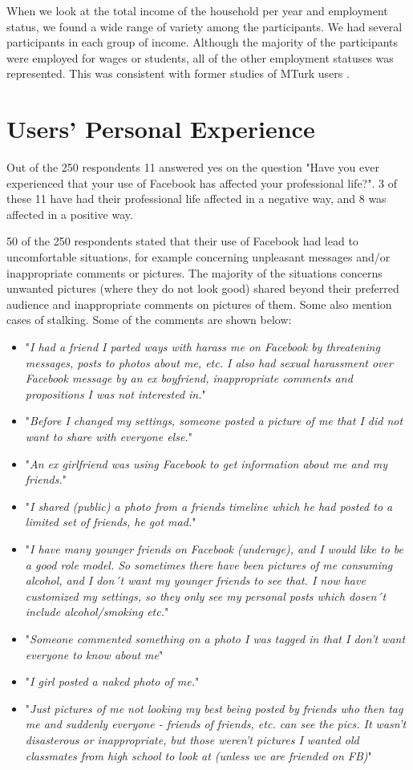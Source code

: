 When we look at the total income of the household per year and employment status, we found a wide range of variety among the participants. We had several participants in each group of income. Although the majority of the participants were employed for wages or students, all of the other employment statuses was represented. This was consistent with former studies of MTurk users \cite{incentivesAmt}. 



\section{Users' Personal Experience}
Out of the 250 respondents 11 answered yes on the question "Have you ever experienced that your use of Facebook has affected your professional life?". 3 of these 11 have had their professional life affected in a negative way, and 8 was affected in a positive way. 

50 of the 250 respondents stated that their use of Facebook had lead to uncomfortable situations, for example concerning unpleasant messages and/or inappropriate comments or pictures. The majority of the situations concerns unwanted pictures (where they do not look good) shared beyond their preferred audience and inappropriate comments on pictures of them. Some also mention cases of stalking. Some of the comments are shown below:

\begin{itemize} 
\item "\textit{I had a friend I parted ways with harass me on Facebook by threatening messages, posts to photos about me, etc. I also had sexual harassment over Facebook message by an ex boyfriend, inappropriate comments and propositions I was not interested in.}"
\item "\textit{Before I changed my settings, someone posted a picture of me that I did not want to share with everyone else.}"
\item "\textit{An ex girlfriend was using Facebook to get information about me and my friends.}"
\item "\textit{I shared (public) a photo from a friends timeline which he had posted to a limited set of friends, he got mad.}"
\item "\textit{I have many younger friends on Facebook (underage), and I would like to be a good role model. So sometimes there have been pictures of me consuming alcohol, and I don´t want my younger friends to see that. I now have customized my settings, so they only see my personal posts which dosen´t include alcohol/smoking etc.}"
\item "\textit{Someone commented something on a photo I was tagged in that I don't want everyone to know about me}"
\item "\textit{I girl posted a naked photo of me.}"
\item "\textit{Just pictures of me not looking my best being posted by friends who then tag me and suddenly everyone - friends of friends, etc. can see the pics. It wasn't disasterous or inappropriate, but those weren't pictures I wanted old classmates from high school to look at (unless we are friended on FB)}"
\end{itemize}

